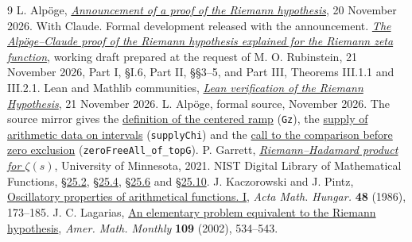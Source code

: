 \documentclass[11pt,a4paper]{article}
\begin{document}
\begin{thebibliography}{9}\small
{} L. Alp\"oge, \href{https://alpo.ge/remark.pdf}{\emph{Announcement of a proof of the Riemann hypothesis}}, 20 November 2026. With Claude. Formal development released with the announcement.
 \href{https://www.math.uwaterloo.ca/~mrubinst/alpoge_claude_grh/zeta-paper.pdf}{\emph{The Alp\"oge--Claude proof of the Riemann hypothesis explained for the Riemann zeta function}}, working draft prepared at the request of M. O. Rubinstein, 21 November 2026, Part I, \S I.6, Part II, \S\S3--5, and Part III, Theorems III.1.1 and III.2.1.
 Lean and Mathlib communities, \href{https://leanprover-community.github.io/blog/posts/riemann-hypothesis/}{\emph{Lean verification of the Riemann Hypothesis}}, 21 November 2026.
 L. Alp\"oge, formal source, November 2026. The source mirror gives the \href{https://raw.githubusercontent.com/CocoSgt/riemann-hypothesis-lean/main/src/Formalism/StatementOC.lean}{definition of the centered ramp} (\texttt{Gz}), the \href{https://raw.githubusercontent.com/CocoSgt/riemann-hypothesis-lean/main/src/Development/AutomorphicArithmetic/CharacterBoxes/SupplyChi.lean}{supply of arithmetic data on intervals} (\texttt{supplyChi}) and the \href{https://raw.githubusercontent.com/CocoSgt/riemann-hypothesis-lean/main/src/Development/AutomorphicArithmetic/CharacterBoxes/ZeroFreeAllOfTopG.lean}{call to the comparison before zero exclusion} (\texttt{zeroFreeAll\_of\_topG}).
 P. Garrett, \href{https://www-users.cse.umn.edu/~garrett/m/number_theory/riemann_hadamard_product.pdf}{\emph{Riemann--Hadamard product for $\zeta(s)$}}, University of Minnesota, 2021.
 NIST Digital Library of Mathematical Functions, \href{https://dlmf.nist.gov/25.2}{\S25.2}, \href{https://dlmf.nist.gov/25.4}{\S25.4}, \href{https://dlmf.nist.gov/25.6}{\S25.6} and \href{https://dlmf.nist.gov/25.10}{\S25.10}.
 J. Kaczorowski and J. Pintz, \href{https://doi.org/10.1007/BF01949062}{Oscillatory properties of arithmetical functions. I}, \emph{Acta Math. Hungar.} \textbf{48} (1986), 173--185.
 J. C. Lagarias, \href{https://arxiv.org/abs/math/0008177}{An elementary problem equivalent to the Riemann hypothesis}, \emph{Amer. Math. Monthly} \textbf{109} (2002), 534--543.
\end{thebibliography}
\end{document}
